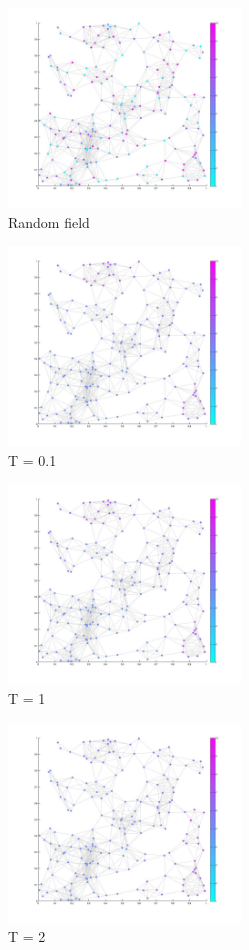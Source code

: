 \documentclass[12pt]{report}
\begin{document}
\begin{figure}[h]
    \centering
    \includegraphics[height=200px]{randomfield}
    \caption{Random field}
\end{figure}


\begin{figure}[h]
    \centering
    \includegraphics[height=200px]{temp01}
    \caption{ T = 0.1}
\end{figure}


\begin{figure}[h]
    \centering
    \includegraphics[height=200px]{temp1}
    \caption{ T = 1 }
\end{figure}


\begin{figure}[h]
    \centering
    \includegraphics[height=200px]{temp2}
    \caption{ T = 2 }
\end{figure}
\end{document}
